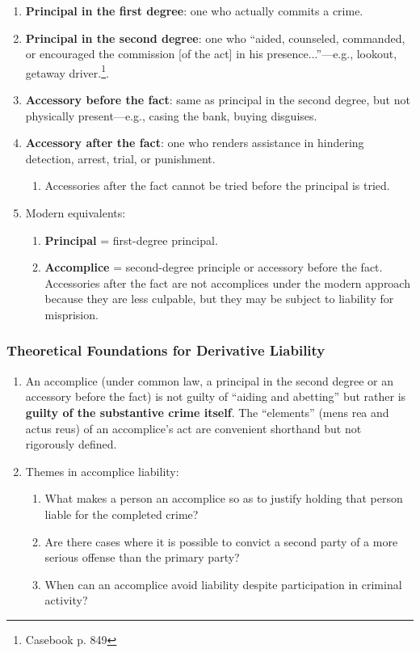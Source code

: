 \begin{enumerate}
    \item \textbf{Principal in the first degree}: one who actually commits a 
    crime.
    \item \textbf{Principal in the second degree}: one who ``aided, counseled, 
    commanded, or encouraged the commission [of the act] in his 
    presence...''---e.g., lookout, getaway driver.\footnote{Casebook p. 849}.
    \item \textbf{Accessory before the fact}: same as principal in the second 
    degree, but not physically present---e.g., casing the bank, buying 
    disguises.
    \item \textbf{Accessory after the fact}: one who renders assistance in 
    hindering detection, arrest, trial, or punishment.
    \begin{enumerate}
        \item Accessories after the fact cannot be tried before the principal 
        is tried.
    \end{enumerate}
    \item Modern equivalents:
    \begin{enumerate}
        \item \textbf{Principal} = first-degree principal.
        \item \textbf{Accomplice} = second-degree principle or accessory 
        before the fact. Accessories after the fact are not accomplices under 
        the modern approach because they are less culpable, but they may be 
        subject to liability for misprision. %
    \end{enumerate}
\end{enumerate}

\subsubsection{Theoretical Foundations for Derivative Liability}

\begin{enumerate}
    \item An accomplice (under common law, a principal in the second degree or 
    an accessory before the fact) is not guilty of ``aiding and abetting'' but 
    rather is \textbf{guilty of the substantive crime itself}. The 
    ``elements'' (mens rea and actus reus) of an accomplice's act are 
    convenient shorthand but not rigorously defined.
    \item Themes in accomplice liability:
    \begin{enumerate}
        \item What makes a person an accomplice so as to justify holding that 
        person liable for the completed crime?
        \item Are there cases where it is possible to convict a second party of a 
        more serious offense than the primary party?
        \item When can an accomplice avoid liability despite participation in 
        criminal activity?
    \end{enumerate}
\end{enumerate}

